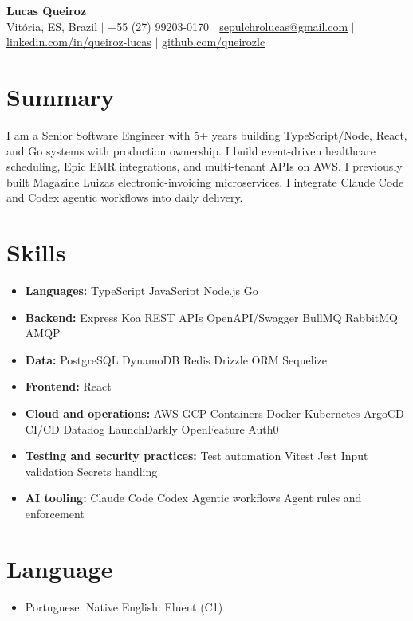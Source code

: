 \documentclass[letterpaper,10pt]{article}
\newcommand{\resumeItem}[1]{\item\small{#1}}
\newcommand{\resumeSubHeadingList}{\begin{itemize}[leftmargin=0.15in, label={}, nosep]}
\newcommand{\resumeSubHeadingListEnd}{\end{itemize}}
\begin{document}
\begin{center}
  \textbf{\Huge Lucas Queiroz} \\[3pt]
  \small Vit\'oria, ES, Brazil $|$ +55 (27) 99203-0170 $|$ \href{mailto:sepulchrolucas@gmail.com}{sepulchrolucas@gmail.com} $|$
  \href{https://linkedin.com/in/queiroz-lucas}{linkedin.com/in/queiroz-lucas} $|$
  \href{https://github.com/queirozlc}{github.com/queirozlc}
\end{center}
\vspace{2pt}

\section{Summary}
I am a Senior Software Engineer with 5+ years building TypeScript/Node, React, and Go systems with production ownership. I build event-driven healthcare scheduling, Epic EMR integrations, and multi-tenant APIs on AWS. I previously built Magazine Luiza\textquotesingle{}s electronic-invoicing microservices. I integrate Claude Code and Codex agentic workflows into daily delivery.

\section{Skills}
\resumeSubHeadingList
\resumeItem{\textbf{Languages:} TypeScript \textbar{} JavaScript \textbar{} Node.js \textbar{} Go}
\resumeItem{\textbf{Backend:} Express \textbar{} Koa \textbar{} REST APIs \textbar{} OpenAPI/Swagger \textbar{} BullMQ \textbar{} RabbitMQ \textbar{} AMQP}
\resumeItem{\textbf{Data:} PostgreSQL \textbar{} DynamoDB \textbar{} Redis \textbar{} Drizzle ORM \textbar{} Sequelize}
\resumeItem{\textbf{Frontend:} React}
\resumeItem{\textbf{Cloud and operations:} AWS \textbar{} GCP \textbar{} Containers \textbar{} Docker \textbar{} Kubernetes \textbar{} ArgoCD \textbar{} CI/CD \textbar{} Datadog \textbar{} LaunchDarkly \textbar{} OpenFeature \textbar{} Auth0}
\resumeItem{\textbf{Testing and security practices:} Test automation \textbar{} Vitest \textbar{} Jest \textbar{} Input validation \textbar{} Secrets handling}
\resumeItem{\textbf{AI tooling:} Claude Code \textbar{} Codex \textbar{} Agentic workflows \textbar{} Agent rules and enforcement}
\resumeSubHeadingListEnd

\section{Language}
\resumeSubHeadingList
\resumeItem{Portuguese: Native \textbar{} English: Fluent (C1)}
\resumeSubHeadingListEnd
\end{document}
